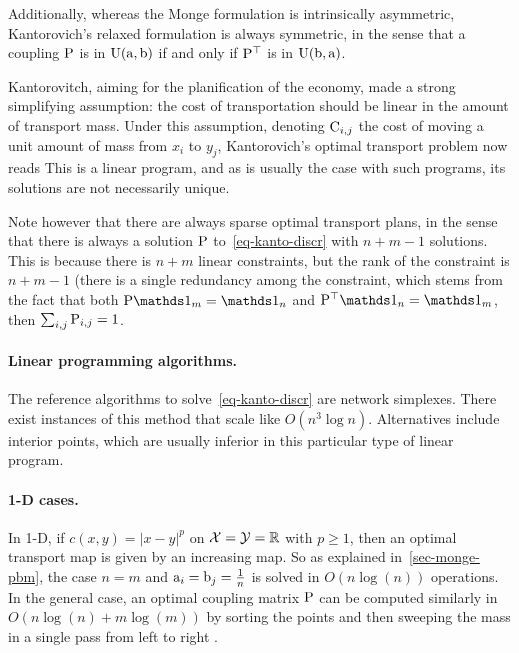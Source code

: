 %
Additionally, whereas the Monge formulation is intrinsically asymmetric, Kantorovich's relaxed formulation is always symmetric, in the sense that a coupling $\P$ is in  $\CouplingsD(\a,\b)$ if and only if  $\transp{\P}$ is in $\CouplingsD(\b,\a)$.

Kantorovitch, aiming for the planification of the economy, made a strong simplifying assumption: the cost of transportation should be linear in the amount of transport mass. 
%
Under this assumption, denoting $\C_{i,j}$ the cost of moving a unit amount of mass from $x_i$ to $y_j$, Kantorovich's optimal transport problem now reads
This is a linear program, and as is usually the case with such programs, its solutions are not necessarily unique. 

Note however that there are always sparse optimal transport plans, in the sense that there is always a solution $\P$ to~\eqref{eq-kanto-discr} with $n+m-1$ solutions. This is because there is $n+m$ linear constraints, but the rank of the constraint is $n+m-1$ (there is a single redundancy among the constraint, which stems from the fact that both $\P\ones_m=\ones_n$ and $\P^\top \ones_n=\ones_m$, then $\sum_{i,j} \P_{i,j}=1$.


\paragraph{Linear programming algorithms.}

The reference algorithms to solve~\eqref{eq-kanto-discr} are network simplexes. There exist instances of this method that scale like  $O(n^3 \log n)$. Alternatives include interior points, which are usually inferior in this particular type of linear program.

\paragraph{1-D cases.}

In 1-D, if $c(x,y)=|x-y|^p$ on $\Xx=\Yy=\RR$ with $p \geq 1$, then an optimal transport map is given by an increasing map. So as explained in~\eqref{sec-monge-pbm}, the case $n=m$ and $\a_i=\b_j=\frac{1}{n}$ is solved in $O(n \log(n))$ operations. 
%
In the general case, an optimal coupling matrix $\P$ can be computed similarly in $O(n\log(n)+m\log(m))$ by sorting the points and then sweeping the mass in a single pass from left to right .


